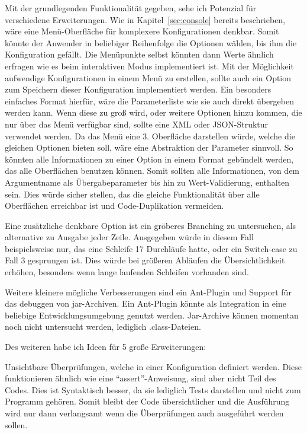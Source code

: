 Mit der grundlegenden Funktionalität gegeben, sehe ich Potenzial für verschiedene Erweiterungen.
Wie in Kapitel~\ref{sec:console} bereits beschrieben, wäre eine Menü-Oberfläche für komplexere Konfigurationen denkbar. Somit könnte der Anwender in beliebiger Reihenfolge die Optionen wählen, bis ihm die Konfiguration gefällt. Die Menüpunkte selbst könnten dann Werte ähnlich erfragen wie es beim interaktiven Modus implementiert ist.
Mit der Möglichkeit aufwendige Konfigurationen in einem Menü zu erstellen, sollte auch ein Option zum Speichern dieser Konfiguration implementiert werden. Ein besonders einfaches Format hierfür, wäre die Parameterliste wie sie auch direkt übergeben werden kann. Wenn diese zu groß wird, oder weitere Optionen hinzu kommen, die nur über das Menü verfügbar sind, sollte eine XML oder JSON-Struktur verwendet werden.
Da das Menü eine 3. Oberfläche darstellen würde, welche die gleichen Optionen bieten soll, wäre eine Abstraktion der Parameter sinnvoll. So könnten alle Informationen zu einer Option in einem Format gebündelt werden, das alle Oberflächen benutzen können. Somit sollten alle Informationen, von dem Argumentname als Übergabeparameter bis hin zu Wert-Validierung, enthalten sein. Dies würde sicher stellen, das die gleiche Funktionalität über alle Oberflächen erreichbar ist und Code-Duplikation vermeiden.

Eine zusätzliche denkbare Option ist ein gröberes Branching zu untersuchen, als alternative zu Ausgabe jeder Zeile. Ausgegeben würde in diesem Fall beispielsweise nur, das eine Schleife 17 Durchläufe hatte, oder ein Switch-case zu Fall 3 gesprungen ist.
Dies würde bei größeren Abläufen die Übersichtlichkeit erhöhen, besonders wenn lange laufenden Schleifen vorhanden sind.

Weitere kleinere mögliche Verbesserungen sind ein Ant-Plugin und Support für das debuggen von jar-Archiven. Ein Ant-Plugin könnte als Integration in eine beliebige Entwicklungsumgebung genutzt werden. Jar-Archive können momentan noch nicht untersucht werden, lediglich .class-Dateien.

Des weiteren habe ich Ideen für 5 große Erweiterungen:

Unsichtbare Überprüfungen, welche in einer Konfiguration definiert werden. Diese funktionieren ähnlich wie eine "`assert"'-Anweisung, sind aber nicht Teil des Codes. Dies ist Syntaktisch besser, da sie lediglich Tests darstellen und nicht zum Programm gehören. Somit bleibt der Code übersichtlicher und die Ausführung wird nur dann verlangsamt wenn die Überprüfungen auch ausgeführt werden sollen.

